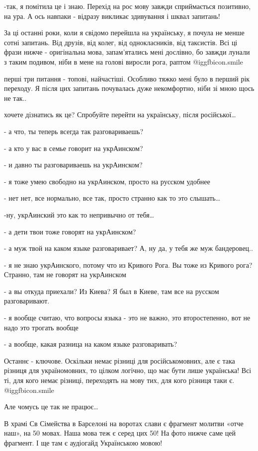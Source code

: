 
-так, я помітила це і знаю. Перехід на рос мову завжди сприймається позитивно,
на ура. А ось навпаки - відразу викликає здивування і шквал запитань!

За ці останні роки, коли я свідомо перейшла на українську, я почула не менше
сотні запитань. Від друзів, від колег, від однокласників,  від таксистів. Всі
ці фрази нижче - оригінальна мова, запам’ятались мені дослівно, бо завжди
лунали з таким подивом, ніби в мене на голові виросли рога, раптом  @igg{fbicon.smile}  

перші три питання - топові, найчастіші. Особливо тяжко мені було в перший рік
переходу. Я після цих запитань почувалась дуже некомфортно, ніби зі мною щось
не так..

хочете дізнатись як це? Спробуйте перейти на українську, після російської…

- а что, ты теперь всегда так разговариваешь?

- а кто у вас в семье говорит на укрАинском?

- и давно ты разговариваешь на укрАинском?

- я тоже умею свободно на укрАинском, просто на русском удобнее

- нет нет, все нормально, все так, просто странно как то это слышать…

-ну, укрАинский это как то непривычно от тебя…

- а дети твои тоже говорят на укрАинском? 

- а муж твой на каком языке разговаривает? А, ну да, у тебя же муж бандеровец..

- я не знаю укрАинского, потому что из Кривого Рога. Вы тоже из Кривого рога?
Странно, там не говорят на укрАинском 

- а  вы откуда приехали? Из Киева? Я был в Киеве, там все на русском
разговаривают. 

- я вообще считаю, что вопросы языка - это не важно, это второстепенно, вот не
надо это трогать вообще

- а вообще, какая разница на каком языке разговаривать?

Останнє - ключове. Оскільки немає різниці для російськомовних, але є така
різниця для україномовних, то цілком логічно, що має бути лише українська! Всі
ті, для кого немає різниці, переходять на мову тих, для кого різниця таки є.  @igg{fbicon.smile}  

Але чомусь це так не працює…

В храмі Св Сімейства в Барселоні на воротах слави є фрагмент молитви «отче
наш», на 50 мовах. Наша мова теж є серед цих 50! На фото нижче саме цей
фрагмент. І ще там є аудіогайд Українською мовою!


